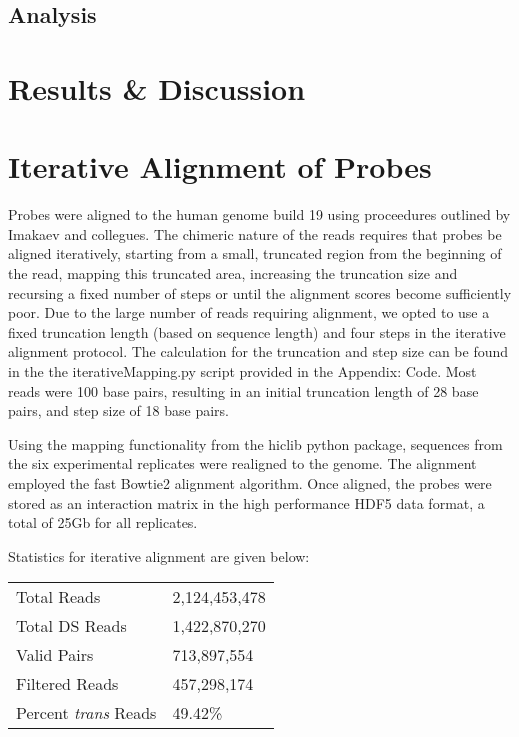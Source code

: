 \documentclass[phd,tocprelim]{cornell}
\begin{document}

\section{Analysis}







\chapter{Results \& Discussion}


%
%

\appendix
\appendixpage
\addappheadtotoc
\chapter{Iterative Alignment of Probes}

Probes were aligned to the human genome build 19 using proceedures outlined by
Imakaev and collegues\cite{imakaev2013}.  The chimeric nature of the reads
requires that probes be aligned iteratively, starting from a small, truncated
region from the beginning of the read, mapping this truncated area, increasing
the truncation size and recursing a fixed number of steps or until the alignment
scores become sufficiently poor.  Due to the large number of reads requiring
alignment, we opted to use a fixed truncation length (based on sequence length)
and four steps in the iterative alignment protocol.  The calculation
for the truncation and step size can be found in the the iterativeMapping.py
script provided in the Appendix: Code.  Most reads were 100 base pairs, resulting
in an initial truncation length of 28 base pairs, and step size of 18 base pairs.

Using the mapping functionality from the hiclib python package\cite{imakaev2013},
sequences from the six experimental replicates were realigned to the genome.  The
alignment employed the fast Bowtie2 alignment algorithm\cite{langmead2012}.  Once
aligned, the probes were stored as an interaction matrix in the high performance
HDF5\cite{hdf5} data format, a total of 25Gb for all replicates.

Statistics for iterative alignment are given below:

\begin{center}
  \begin{table}
    \begin{tabular}{l l}
    \toprule
    Total Reads & 2,124,453,478 \\
    Total DS Reads & 1,422,870,270 \\
    Valid Pairs & 713,897,554 \\
    Filtered Reads & 457,298,174 \\
    Percent \textit{trans} Reads & 49.42\% \\
    \bottomrule
    \end{tabular}
  \end{table}
\end{center}
\end{document}
